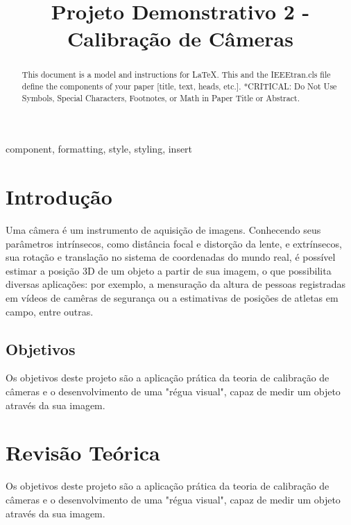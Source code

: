 \documentclass[conference]{IEEEtran}
\begin{document}
\title{Projeto Demonstrativo 2 - Calibração de Câmeras}

\author{
}

\maketitle

\begin{abstract}
This document is a model and instructions for \LaTeX.
This and the IEEEtran.cls file define the components of your paper [title, text, heads, etc.]. *CRITICAL: Do Not Use Symbols, Special Characters, Footnotes, 
or Math in Paper Title or Abstract.
\end{abstract}

\begin{IEEEkeywords}
component, formatting, style, styling, insert
\end{IEEEkeywords}

\section{Introdução}
Uma câmera é um instrumento de aquisição de imagens. Conhecendo seus parâmetros intrínsecos, como distância focal e distorção da lente, e extrínsecos, sua rotação e translação no sistema de coordenadas do mundo real, é possível estimar a posição 3D de um objeto a partir de sua imagem\cite{tese}, o que possibilita diversas aplicações: por exemplo, a mensuração da altura de pessoas registradas em vídeos de camêras de segurança ou a estimativas de posições de atletas em campo, entre outras.

\subsection{Objetivos}
Os objetivos deste projeto são a aplicação prática da teoria de calibração de câmeras e o desenvolvimento de uma "régua visual", capaz de medir um objeto através da sua imagem.

\section{Revisão Teórica}
Os objetivos deste projeto são a aplicação prática da teoria de calibração de câmeras e o desenvolvimento de uma "régua visual", capaz de medir um objeto através da sua imagem.
\end{document}

